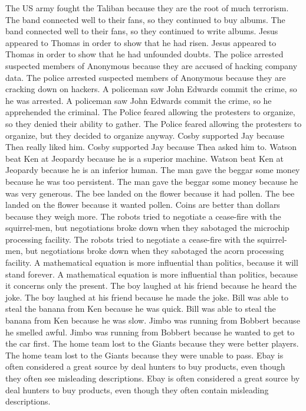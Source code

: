 \documentclass{article}
\begin{document}
\begin{enumerate}
The US army fought the Taliban because they are the root of much terrorism.
The band connected well to their fans, so they continued to buy albums.
The band connected well to their fans, so they continued to write albums.
Jesus appeared to Thomas in order to show that he had risen.
Jesus appeared to Thomas in order to show that he had unfounded doubts.
The police arrested suspected members of Anonymous because they are accused of hacking company data.
The police arrested suspected members of Anonymous because they are cracking down on hackers.
A policeman saw John Edwards commit the crime, so he was arrested.
A policeman saw John Edwards commit the crime, so he apprehended the criminal.
The Police feared allowing the protesters to organize, so they denied their ability to gather.
The Police feared allowing the protesters to organize, but they decided to organize anyway.
Cosby supported Jay because Thea really liked him.
Cosby supported Jay because Thea asked him to.
Watson beat Ken at Jeopardy because he is a superior machine.
Watson beat Ken at Jeopardy because he is an inferior human.
The man gave the beggar some money because he was too persistent.
The man gave the beggar some money because he was very generous.
The bee landed on the flower because it had pollen.
The bee landed on the flower because it wanted pollen.
Coins are better than dollars because they weigh more.
The robots tried to negotiate a cease-fire with the squirrel-men, but negotiations broke down when they sabotaged the microchip processing facility.
The robots tried to negotiate a cease-fire with the squirrel-men, but negotiations broke down when they sabotaged the acorn processing facility.
A mathematical equation is more influential than politics, because it will stand forever.
A mathematical equation is more influential than politics, because it concerns only the present.
The boy laughed at his friend because he heard the joke.
The boy laughed at his friend because he made the joke.
Bill was able to steal the banana from Ken because he was quick.
Bill was able to steal the banana from Ken because he was slow.
Jimbo was running from Bobbert because he smelled awful.
Jimbo was running from Bobbert because he wanted to get to the car first.
The home team lost to the Giants because they were better players.
The home team lost to the Giants because they were unable to pass.
Ebay is often considered a great source by deal hunters to buy products, even though they often see misleading descriptions.
Ebay is often considered a great source by deal hunters to buy products, even though they often contain misleading descriptions.

\end{enumerate}
\end{document}
